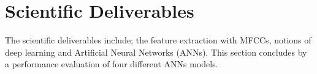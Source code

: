 
\section{Scientific Deliverables}

The scientific deliverables include; the feature extraction with MFCCs, notions
of deep learning and Artificial Neural Networks (ANNs). This section concludes
by a performance evaluation of four different ANNs models.
